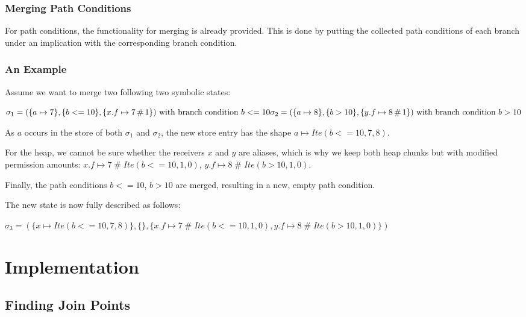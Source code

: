 \documentclass[11pt]{article}
\DeclareMathOperator{\perm}{\mathbin{\#}}
\begin{document}
    \subsubsection{Merging Path Conditions}

    For path conditions, the functionality for merging is already provided.
    This is done by putting the collected path conditions of each branch
    under an implication with the corresponding branch condition.


    \subsubsection{An Example}

    Assume we want to merge two following two symbolic states:
    
    \begin{math}
        \sigma_1 = (\{a \mapsto 7\}, \{b <= 10\}, \{x.f \mapsto 7 \perm 1\}) \text{ with branch condition } b <= 10 \\
        \sigma_2 = (\{a \mapsto 8\}, \{b > 10\}, \{y.f \mapsto 8 \perm 1\}) \text{ with branch condition } b > 10
    \end{math}

    As $a$ occurs in the store of both $\sigma_1$ and $\sigma_2$,
    the new store entry has the shape $a \mapsto Ite(b <= 10, 7, 8)$.

    For the heap, we cannot be sure whether the receivers $x$ and $y$
    are aliases, which is why we keep both heap chunks but with modified
    permission amounts: $x.f \mapsto 7 \perm Ite(b <= 10, 1, 0)$, $y.f \mapsto 8 \perm Ite(b > 10, 1, 0)$.

    Finally, the path conditions $b <= 10$, $b > 10$ are merged, resulting
    in a new, empty path condition.

    The new state is now fully described as follows: 

    \begin{math}
        \sigma_3 = (\{x \mapsto Ite(b <= 10, 7, 8)\}, \{\}, \{x.f \mapsto 7 \perm Ite(b <= 10, 1, 0), y.f \mapsto 8 \perm Ite(b > 10, 1, 0)\})
    \end{math}

    \newpage
    \section{Implementation}

    \subsection{Finding Join Points} \label{finding-join-points}
\end{document}
